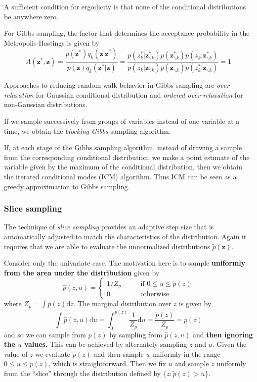 \documentclass[a4paper]{report}
\newcommand{\ud}{\mathrm{d}}
\renewcommand{\bf}{\mathbf}
\newcommand{\imp}[1]{{\color{blue}\textit{#1}}}
\begin{document}
A sufficient condition for ergodicity is that none of the conditional distributions be anywhere zero.

For Gibbs sampling, the factor that determines the acceptance probability in the Metropolis-Hastings is given by
\begin{equation}
	A(\bf{z}^*,\bf{z})=\frac{p(\bf{z}^*)q_k(\bf{z|z}^*)}{p(\bf{z})q_k(\bf{z}^*|\bf{z})}=\frac{p(z_k^*|\bf{z}_{\backslash k}^*)p(\bf{z}_{\backslash k}^*)p(z_k|\bf{z}_{\backslash k}^*)}{p(z_k|\bf{z}_{\backslash k})p(\bf{z}_{\backslash k})p(z_k^*|\bf{z}_{\backslash k})} = 1
\end{equation}

Approaches to reducing random walk behavior in Gibbs sampling are \imp{over-relaxation} for Gaussian conditional distribution and \imp{ordered over-relaxation} for non-Gaussian distributions.

If we sample successively from groups of variables instead of one variable at a time, we obtain the \imp{blocking Gibbs} sampling algorithm.

If, at each stage of the Gibbs sampling algorithm, instead of drawing a sample from the corresponding conditional distribution, we make a point estimate of the variable given by the maximum of the conditional distribution, then we obtain the iterated conditional modes (ICM) algorithm. Thus ICM can be seen as a greedy approximation to Gibbs sampling.
\subsubsection{Slice sampling}
The technique of \imp{slice sampling} provides an adaptive step size that is automatically adjusted to match the characteristics of the distribution. Again it requires that we are able to evaluate the unnormalized distributions $\tilde{p}{(\bf{z})}$.

Consider only the univariate case. The motivation here is to sample \textbf{uniformly from the area under the distribution} given by
\begin{equation}
	\hat{p}(z,u) = \begin{cases}
		1/Z_p \qquad &\text{if $0 \leq u \leq \tilde{p}(z)$}\\
		0 \qquad &\text{otherwise}
	\end{cases}
\end{equation}
where $Z_p = \int \tilde{p}(z) \ud z$. The marginal distribution over $z$ is given by
\begin{equation}
	\int \hat{p}(z,u) \ud u = \int_{0}^{\tilde{p}(z)} \frac{1}{Z_p} \ud u = \frac{\tilde{p}(z)}{Z_p} = p(z)
\end{equation}
and so we can sample from $p(z)$ by sampling from $\hat{p}(z,u)$ and \textbf{then ignoring the $u$ values.} This can be achieved by alternately sampling $z$ and $u$. Given the value of $z$ we evaluate $\tilde{p}(z)$ and then sample $u$ uniformly in the range $0 \leq u \leq \tilde{p}(z)$, which is straightforward. Then we fix $u$ and sample $z$ uniformly from the ``slice'' through the distribution defined by $\{ z: \tilde{p}(z) > u \}$.
\end{document}
